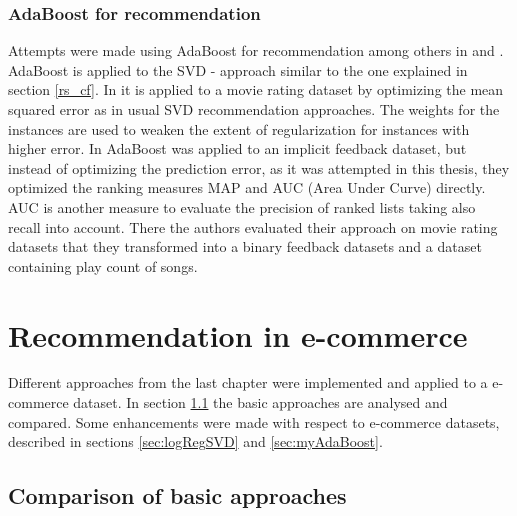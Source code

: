 \documentclass[10pt]{reportMaster}
\begin{document}
\subsection{AdaBoost for recommendation}
\label{sec:adaBoostForRecommendation}
Attempts were made using AdaBoost for recommendation among others in \cite{boostingCFRatings} and \cite{boostingAUC}.
AdaBoost is applied to the SVD - approach similar to the one explained in section \ref{rs_cf}.
In \cite{boostingCFRatings} it is applied to a movie rating dataset by optimizing the mean squared error as in usual SVD recommendation approaches.
The weights for the instances are used to weaken the extent of regularization for instances with higher error.
In \cite{boostingAUC} AdaBoost was applied to an implicit feedback dataset, but instead of optimizing the prediction error, as it was attempted in this thesis, they optimized the ranking measures MAP and AUC (Area Under Curve) directly.
AUC is another measure to evaluate the precision of ranked lists taking also recall into account.
There the authors evaluated their approach on movie rating datasets that they transformed into a binary feedback datasets and a dataset containing play count of songs.











\chapter{Recommendation in e-commerce}
\label{sec:ecommerceRec}

Different approaches from the last chapter were implemented and applied to a e-commerce dataset.
In section \ref{sec:comparison} the basic approaches are analysed and compared.
Some enhancements were made with respect to e-commerce datasets, described in sections \ref{sec:logRegSVD} and \ref{sec:myAdaBoost}.


\section{Comparison of basic approaches}
\label{sec:comparison}
\end{document}
